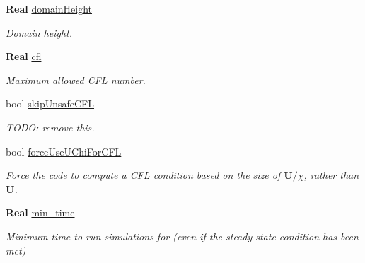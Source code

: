 \begin{DoxyCompactItemize}
\mbox{\label{struct_mushy_layer_options_acfe9c8efd6b6bde93149c9e807efdc61}} 
\textbf{ Real} \hyperlink{struct_mushy_layer_options_acfe9c8efd6b6bde93149c9e807efdc61}{domain\+Height}
\begin{DoxyCompactList}\small\item\em Domain height. \end{DoxyCompactList}\item 
\mbox{\label{struct_mushy_layer_options_a20e47527add942e9f8e1b8c74b613719}} 
\textbf{ Real} \hyperlink{struct_mushy_layer_options_a20e47527add942e9f8e1b8c74b613719}{cfl}
\begin{DoxyCompactList}\small\item\em Maximum allowed C\+FL number. \end{DoxyCompactList}\item 
\mbox{\label{struct_mushy_layer_options_a2ebb97c5431aecafe207cc55e3c56891}} 
bool \hyperlink{struct_mushy_layer_options_a2ebb97c5431aecafe207cc55e3c56891}{skip\+Unsafe\+C\+FL}
\begin{DoxyCompactList}\small\item\em T\+O\+DO\+: remove this. \end{DoxyCompactList}\item 
\mbox{\label{struct_mushy_layer_options_aee9863fcf25858c91c53a3a987f1d9a3}} 
bool \hyperlink{struct_mushy_layer_options_aee9863fcf25858c91c53a3a987f1d9a3}{force\+Use\+U\+Chi\+For\+C\+FL}
\begin{DoxyCompactList}\small\item\em Force the code to compute a C\+FL condition based on the size of $\mathbf{U}/\chi$, rather than $ \mathbf{U} $. \end{DoxyCompactList}\item 
\mbox{\label{struct_mushy_layer_options_af2368a8f3239bac1f42f9902474bb24f}} 
\textbf{ Real} \hyperlink{struct_mushy_layer_options_af2368a8f3239bac1f42f9902474bb24f}{min\+\_\+time}
\begin{DoxyCompactList}\small\item\em Minimum time to run simulations for (even if the steady state condition has been met) \end{DoxyCompactList}\item 

\end{DoxyCompactItemize}
